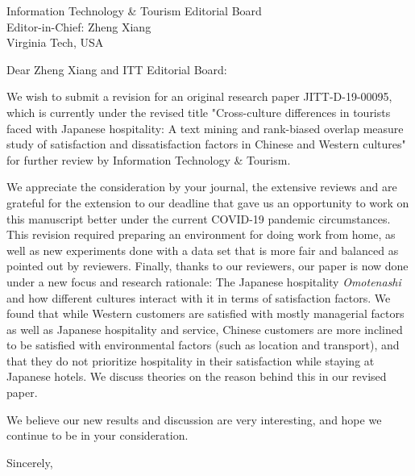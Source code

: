 \documentclass{letter}
\begin{document}
\begin{letter}{
Information Technology \& Tourism Editorial Board \\
Editor-in-Chief:  Zheng Xiang\\
Virginia Tech, USA}

\opening{Dear Zheng Xiang and ITT Editorial Board:}

We wish to submit a revision for an original research paper JITT-D-19-00095, which is currently under the revised title "Cross-culture differences in tourists faced with Japanese hospitality: A text mining and rank-biased overlap measure study of satisfaction and dissatisfaction factors in Chinese and Western cultures" for further review by Information Technology \& Tourism.

We appreciate the consideration by your journal, the extensive reviews and are grateful for the extension to our deadline that gave us an opportunity to work on this manuscript better under the current COVID-19 pandemic circumstances. This revision required preparing an environment for doing work from home, as well as new experiments done with a data set that is more fair and balanced as pointed out by reviewers. Finally, thanks to our reviewers, our paper is now done under a new focus and research rationale: The Japanese hospitality \textit{Omotenashi} and how different cultures interact with it in terms of satisfaction factors. We found that while Western customers are satisfied with mostly managerial factors as well as Japanese hospitality and service, Chinese customers are more inclined to be satisfied with environmental factors (such as location and transport),  and that they do not prioritize hospitality in their satisfaction while staying at Japanese hotels. We discuss theories on the reason behind this in our revised paper.

We believe our new results and discussion are very interesting, and hope we continue to be in your consideration.

\closing{Sincerely,}


\end{letter}
\end{document}
